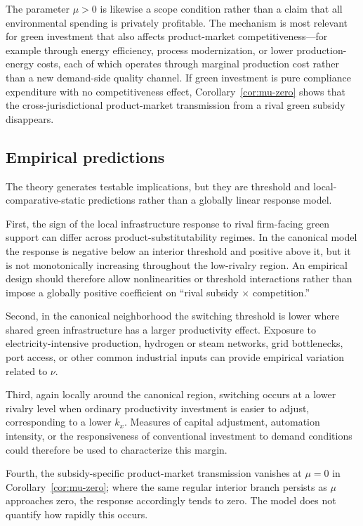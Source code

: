 The parameter $\mu>0$ is likewise a scope condition rather than a claim that all environmental spending is privately profitable. The mechanism is most relevant for green investment that also affects product-market competitiveness---for example through energy efficiency, process modernization, or lower production-energy costs, each of which operates through marginal production cost rather than a new demand-side quality channel. If green investment is pure compliance expenditure with no competitiveness effect, Corollary~\ref{cor:mu-zero} shows that the cross-jurisdictional product-market transmission from a rival green subsidy disappears.

\subsection{Empirical predictions}

The theory generates testable implications, but they are threshold and local-comparative-static predictions rather than a globally linear response model.

First, the sign of the local infrastructure response to rival firm-facing green support can differ across product-substitutability regimes. In the canonical model the response is negative below an interior threshold and positive above it, but it is not monotonically increasing throughout the low-rivalry region. An empirical design should therefore allow nonlinearities or threshold interactions rather than impose a globally positive coefficient on ``rival subsidy $\times$ competition.''

Second, in the canonical neighborhood the switching threshold is lower where shared green infrastructure has a larger productivity effect. Exposure to electricity-intensive production, hydrogen or steam networks, grid bottlenecks, port access, or other common industrial inputs can provide empirical variation related to $\nu$.

Third, again locally around the canonical region, switching occurs at a lower rivalry level when ordinary productivity investment is easier to adjust, corresponding to a lower $k_x$. Measures of capital adjustment, automation intensity, or the responsiveness of conventional investment to demand conditions could therefore be used to characterize this margin.

Fourth, the subsidy-specific product-market transmission vanishes at $\mu=0$ in Corollary~\ref{cor:mu-zero}; where the same regular interior branch persists as $\mu$ approaches zero, the response accordingly tends to zero. The model does not quantify how rapidly this occurs.

